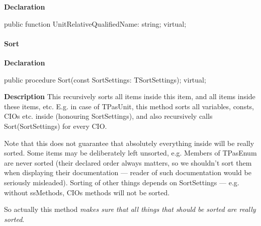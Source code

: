 \documentclass{report}
\newif\ifpdf
\begin{document}
\label{PasDoc_Items.TPasItem-UnitRelativeQualifiedName}
\begin{list}{}{
\setlength{\itemindent}{0cm}
\setlength{\listparindent}{0cm}
\setlength{\leftmargin}{\evensidemargin}
\addtolength{\leftmargin}{\tmplength}
\settowidth{\labelsep}{X}
\addtolength{\leftmargin}{\labelsep}
\setlength{\labelwidth}{\tmplength}
}
\item[\textbf{Declaration}\hfill]
\ifpdf
\begin{flushleft}
\fi
\begin{ttfamily}
public function UnitRelativeQualifiedName: string; virtual;\end{ttfamily}

\ifpdf
\end{flushleft}
\fi

\end{list}
\paragraph*{Sort}\hspace*{\fill}

\label{PasDoc_Items.TPasItem-Sort}
\begin{list}{}{
\setlength{\itemindent}{0cm}
\setlength{\listparindent}{0cm}
\setlength{\leftmargin}{\evensidemargin}
\addtolength{\leftmargin}{\tmplength}
\settowidth{\labelsep}{X}
\addtolength{\leftmargin}{\labelsep}
\setlength{\labelwidth}{\tmplength}
}
\item[\textbf{Declaration}\hfill]
\ifpdf
\begin{flushleft}
\fi
\begin{ttfamily}
public procedure Sort(const SortSettings: TSortSettings); virtual;\end{ttfamily}

\ifpdf
\end{flushleft}
\fi

\par
\item[\textbf{Description}]
This recursively sorts all items inside this item, and all items inside these items, etc. E.g. in case of TPasUnit, this method sorts all variables, consts, CIOs etc. inside (honouring SortSettings), and also recursively calls Sort(SortSettings) for every CIO.

Note that this does not guarantee that absolutely everything inside will be really sorted. Some items may be deliberately left unsorted, e.g. Members of TPasEnum are never sorted (their declared order always matters, so we shouldn't sort them when displaying their documentation --- reader of such documentation would be seriously misleaded). Sorting of other things depends on SortSettings --- e.g. without ssMethods, CIOs methods will not be sorted.

So actually this method \textit{makes sure that all things that should be sorted are really sorted}.

\end{list}
\end{document}
